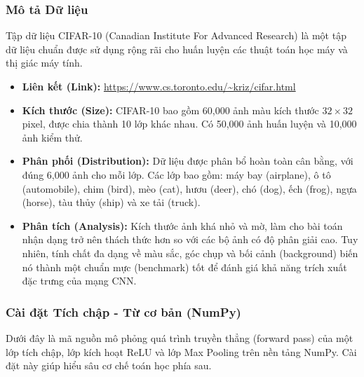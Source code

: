 \subsubsection{Mô tả Dữ liệu}
Tập dữ liệu CIFAR-10 (Canadian Institute For Advanced Research) là một tập dữ liệu chuẩn được sử dụng rộng rãi cho huấn luyện các thuật toán học máy và thị giác máy tính.
\begin{itemize}
    \item \textbf{Liên kết (Link):} \url{https://www.cs.toronto.edu/~kriz/cifar.html}
    \item \textbf{Kích thước (Size):} CIFAR-10 bao gồm 60,000 ảnh màu kích thước $32 \times 32$ pixel, được chia thành 10 lớp khác nhau. Có 50,000 ảnh huấn luyện và 10,000 ảnh kiểm thử.
    \item \textbf{Phân phối (Distribution):} Dữ liệu được phân bổ hoàn toàn cân bằng, với đúng 6,000 ảnh cho mỗi lớp. Các lớp bao gồm: máy bay (airplane), ô tô (automobile), chim (bird), mèo (cat), hươu (deer), chó (dog), ếch (frog), ngựa (horse), tàu thủy (ship) và xe tải (truck).
    \item \textbf{Phân tích (Analysis):} Kích thước ảnh khá nhỏ và mờ, làm cho bài toán nhận dạng trở nên thách thức hơn so với các bộ ảnh có độ phân giải cao. Tuy nhiên, tính chất đa dạng về màu sắc, góc chụp và bối cảnh (background) biến nó thành một chuẩn mực (benchmark) tốt để đánh giá khả năng trích xuất đặc trưng của mạng CNN.
\end{itemize}

\subsubsection{Cài đặt Tích chập - Từ cơ bản (NumPy)}

Dưới đây là mã nguồn mô phỏng quá trình truyền thẳng (forward pass) của một lớp tích chập, lớp kích hoạt ReLU và lớp Max Pooling trên nền tảng NumPy. Cài đặt này giúp hiểu sâu cơ chế toán học phía sau.

